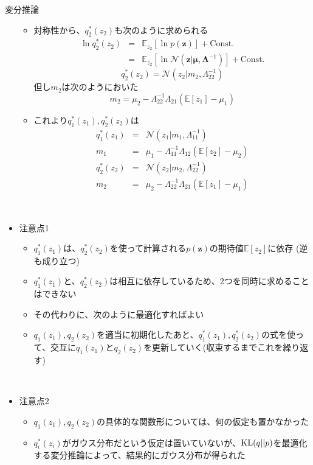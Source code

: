 \documentclass[dvipdfmx,notheorems,t]{beamer}
\begin{document}
\begin{frame}{変分推論}
\begin{itemize}
\begin{itemize}
		\item 対称性から、$q_2^*(z_2)$も次のように求められる
		\begin{eqnarray}
			\ln q_2^*(z_2) &=& \mathbb{E}_{z_2}[\ln p(\bm{z})] + \mathrm{Const.} \\
			&=& \mathbb{E}_{z_2}[\ln \mathcal{N}(\bm{z} | \bm{\mu}, \bm{\Lambda}^{-1})] + \mathrm{Const.}
		\end{eqnarray}
		\begin{equation}
			q_2^*(z_2) = \mathcal{N}(z_2 | m_2, \Lambda_{22}^{-1})
		\end{equation}
		但し$m_2$は次のようにおいた
		\begin{equation}
			m_2 = \mu_2 - \Lambda_{22}^{-1} \Lambda_{21} (\mathbb{E}[z_1] - \mu_1)
		\end{equation}
		
		\item これより$q_1^*(z_1), q_2^*(z_2)$は
		\begin{eqnarray}
			q_1^*(z_1) &=& \mathcal{N}(z_1 | m_1, \Lambda_{11}^{-1}) \\
			m_1 &=& \mu_1 - \Lambda_{11}^{-1} \Lambda_{12} (\mathbb{E}[z_2] - \mu_2) \\
			q_2^*(z_2) &=& \mathcal{N}(z_2 | m_2, \Lambda_{22}^{-1}) \\
			m_2 &=& \mu_2 - \Lambda_{22}^{-1} \Lambda_{21} (\mathbb{E}[z_1] - \mu_1)
		\end{eqnarray}
	\end{itemize} \
	
	\item 注意点1
	\begin{itemize}
		\item $q_1^*(z_1)$は、$q_2^*(z_2)$を使って計算される$p(\bm{z})$の期待値$\mathbb{E}[z_2]$に依存 (逆も成り立つ)
		\item $q_1^*(z_1)$と、$q_2^*(z_2)$は\alert{相互に依存している}ため、2つを同時に求めることはできない
		\item その代わりに、次のように最適化すればよい
		\newline
		\item $q_1(z_1), q_2(z_2)$を適当に初期化したあと、$q_1^*(z_1), q_2^*(z_2)$の式を使って、交互に$q_1(z_1)$と$q_2(z_2)$を更新していく(収束するまでこれを繰り返す)
	\end{itemize} \
	
	\item 注意点2
	\begin{itemize}
		\item $q_1(z_1), q_2(z_2)$の具体的な関数形については、\alert{何の仮定も置かなかった}
		\item $q_i^*(z_i)$がガウス分布だという仮定は置いていないが、$\operatorname{KL} (q || p)$を最適化する\alert{変分推論}によって、\alert{結果的にガウス分布が得られた}
	\end{itemize}
\end{itemize}

\end{frame}
\end{document}
